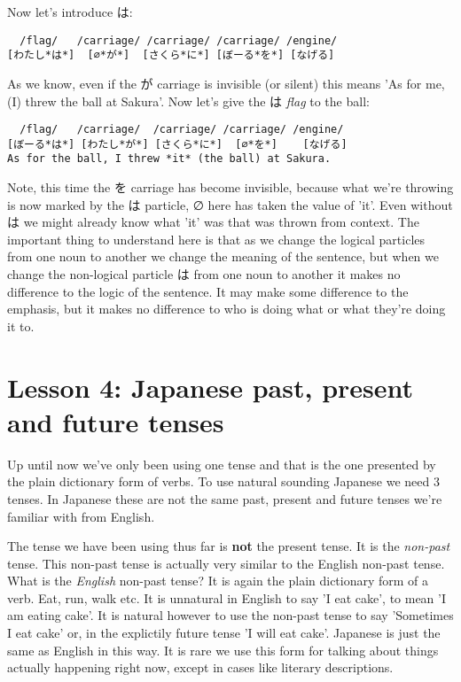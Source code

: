 \documentclass[11pt]{article}
\begin{document}
Now let's introduce は:
\begin{verbatim}
  /flag/   /carriage/ /carriage/ /carriage/ /engine/
[わたし*は*]  [∅*が*]  [さくら*に*] [ぼーる*を*] [なげる]
\end{verbatim}
As we know, even if the が carriage is invisible (or silent) this means 'As for me, (I) threw the ball at Sakura'. Now let's give the は \emph{flag} to the ball:
\begin{verbatim}
  /flag/   /carriage/  /carriage/ /carriage/ /engine/
[ぼーる*は*] [わたし*が*] [さくら*に*]  [∅*を*]    [なげる]
As for the ball, I threw *it* (the ball) at Sakura.
\end{verbatim}
Note, this time the を carriage has become invisible, because what we're throwing is now marked by the は particle, ∅ here has taken the value of 'it'. Even without は we might already know what 'it' was that was thrown from context. The important thing to understand here is that as we change the logical particles from one noun to another we change the meaning of the sentence, but when we change the non-logical particle は from one noun to another it makes no difference to the logic of the sentence. It may make some difference to the emphasis, but it makes no difference to who is doing what or what they're doing it to.

\section{Lesson 4: Japanese past, present and future tenses}
\label{sec:orgc82412d}
Up until now we've only been using one tense and that is the one presented by the plain dictionary form of verbs. To use natural sounding Japanese we need 3 tenses. In Japanese these are not the same past, present and future tenses we're familiar with from English.

The tense we have been using thus far is \textbf{not} the present tense. It is the \emph{non-past} tense. This non-past tense is actually very similar to the English non-past tense. What is the \emph{English} non-past tense? It is again the plain dictionary form of a verb. Eat, run, walk etc. It is unnatural in English to say 'I eat cake', to mean 'I am eating cake'. It is natural however to use the non-past tense to say 'Sometimes I eat cake' or, in the explictily future tense 'I will eat cake'. Japanese is just the same as English in this way. It is rare we use this form for talking about things actually happening right now, except in cases like literary descriptions.
\end{document}
